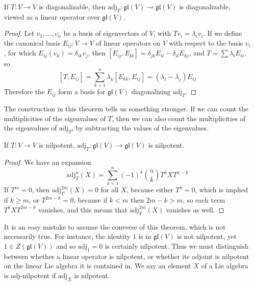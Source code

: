 \begin{theorem}
    If $T: V \to V$ is diagonalizable, then $\text{adj}_T: \mathfrak{gl}(V) \to \mathfrak{gl}(V)$ is diagonalizable, viewed as a linear operator over $\mathfrak{gl}(V)$.
\end{theorem}
\begin{proof}
    Let $v_1, \dots, v_n$ be a basis of eigenvectors of $V$, with $Tv_i = \lambda_i v_i$. If we define the canonical basis $E_{ij}: V \to V$ of linear operators on $V$ with respect to the basis $v_i$, for which $E_{ij}(v_k) = \delta_{ik} v_j$, then $[E_{ij}, E_{kl}] = \delta_{jk} E_{il} - \delta_{il} E_{kj}$, and $T = \sum \lambda_i E_{ii}$, so
    \[ [T, E_{ij}] = \sum_{k = 1}^n \lambda_k [ E_{kk}, E_{ij} ] = (\lambda_i - \lambda_j) E_{ij} \]
    Therefore the $E_{ij}$ form a basis for $\mathfrak{gl}(V)$ diagonalizing $\text{adj}_T$.
\end{proof}

The construction in this theorem tells us something stronger. If we can count the multiplicities of the eigenvalues of $T$, then we can also count the multiplicities of the eigenvalues of $\text{adj}_T$, by subtracting the values of the eigenvalues.

\begin{theorem}
    If $T: V \to V$ is nilpotent, $\text{adj}_T: \mathfrak{gl}(V) \to \mathfrak{gl}(V)$ is nilpotent.
\end{theorem}
\begin{proof}
    We have an expansion
    \[ \text{adj}_T^n(X) = \sum_{k = 1}^n (-1)^k {n \choose k} T^kXT^{n-k} \]
    If $T^m = 0$, then $\text{adj}_T^{2m}(X) = 0$ for all $X$, because either $T^k = 0$, which is implied if $k \geq m$, or $T^{2m - k} = 0$, because if $k < m$ then $2m - k > m$, so each term $T^kXT^{2m-k}$ vanishes, and this means that $\text{adj}_T^{2m}(X)$ vanishes as well.
\end{proof}

It is an easy mistake to assume the converse of this theorem, which is not necessarily true. For instance, the identity $1$ is in $\mathfrak{gl}(V)$ is not nilpotent, yet $1 \in Z(\mathfrak{gl}(V))$ and so $\text{adj}_1 = 0$ is certainly nilpotent. Thus we must distinguish between whether a linear operator is nilpotent, or whether its adjoint is nilpotent on the linear Lie algebra it is contained in. We say an element $X$ of a Lie algebra is adj-nilpotent if $\text{adj}_X$ is nilpotent.


